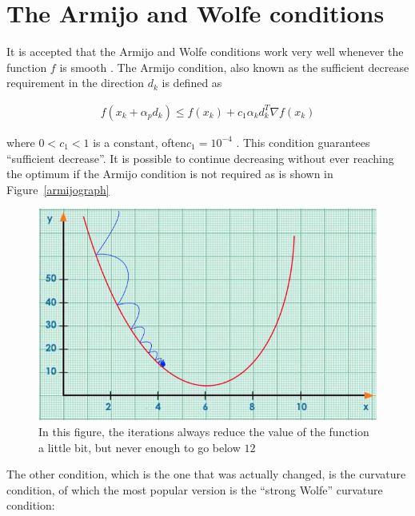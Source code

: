 \section{The Armijo and Wolfe conditions} \label{Wolfeconditions}

It is accepted that the Armijo and Wolfe conditions work very well whenever the function $f$ is smooth \citep{MR1855221}. The Armijo condition, also known as the sufficient decrease requirement in the direction $d_k$ is defined as

\begin{equation} \label{armijocondition}
  \begin{aligned}
    f(x_k + \alpha_p d_k) \leq f(x_k) + c_1 \alpha_k d_k^T \nabla f(x_k)
  \end{aligned}
\end{equation}

where $0 < c_1 < 1$ is a constant, often$c_1 = 10^{-4}$ \citep{nocedal}. This condition guarantees ``sufficient decrease''. It is possible to continue decreasing without ever reaching the optimum if the Armijo condition is not required as is shown in Figure~\eqref{armijograph}

\begin{figure} 
\begin{center}
\includegraphics[scale=0.5]{Figures/armijo.png}
\caption[Representation of the Armijo Condition in a Nutshell]{In this figure, the iterations always reduce the value of the function a little bit, but never enough to go below $12$}
\label{armijograph}
\end{center}
\end{figure}

The other condition, which is the one that was actually changed, is the curvature condition, of which the most popular version is the ``strong Wolfe'' curvature condition:

